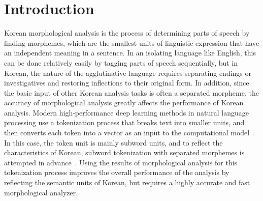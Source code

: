 \documentclass[AMS,STIX2COL]{WileyNJD-v2}
\begin{document}
    \section{Introduction}\label{sec:intro}

    Korean morphological analysis is the process of determining parts of speech by finding morphemes, which are the smallest units of linguistic expression that have an independent meaning in a sentence.
    In an isolating language like English, this can be done relatively easily by tagging parts of speech sequentially, but in Korean, the nature of the agglutinative language requires separating endings or investigatives and restoring inflections to their original form.
    In addition, since the basic input of other Korean analysis tasks is often a separated morpheme, the accuracy of morphological analysis greatly affects the performance of Korean analysis.
    Modern high-performance deep learning methods in natural language processing use a tokenization process that breaks text into smaller units, and then converts each token into a vector as an input to the computational model~\cite{Mikolov2013}.
    In this case, the token unit is mainly subword units, and to reflect the characteristics of Korean, subword tokenization with separated morphemes is attempted in advance~\cite{SongHJ2021}.
    Using the results of morphological analysis for this tokenization process improves the overall performance of the analysis by reflecting the semantic units of Korean, but requires a highly accurate and fast morphological analyzer.
\end{document}
